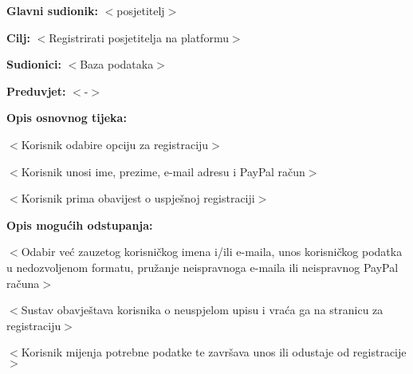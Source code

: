 								\noindent {}
							\begin{packed_item}
			
								\item \textbf{Glavni sudionik: }$<$posjetitelj$>$
								\item  \textbf{Cilj:} $<$Registrirati posjetitelja na platformu$>$
								\item  \textbf{Sudionici:} $<$Baza podataka$>$
								\item  \textbf{Preduvjet:} $<$-$>$
								\item  \textbf{Opis osnovnog tijeka:}
								
								\item[] \begin{packed_enum}
			
									\item $<$Korisnik odabire opciju za registraciju$>$
									\item $<$Korisnik unosi ime, prezime, e-mail adresu i PayPal račun$>$
									\item $<$Korisnik prima obavijest o uspješnoj registraciji$>$
								\end{packed_enum}
								
								\item  \textbf{Opis mogućih odstupanja:}
								
								\item[] \begin{packed_item}
			
									\item[2.a] $<$Odabir već zauzetog korisničkog imena i/ili e-maila, unos korisničkog 
									podatka u nedozvoljenom formatu, pružanje neispravnoga e-maila ili neispravnog PayPal računa$>$
									\item[] \begin{packed_enum}
										
										\item $<$Sustav obavještava korisnika o neuspjelom upisu i 
										vraća ga na stranicu za registraciju$>$
										\item $<$Korisnik mijenja potrebne podatke te završava unos ili
										odustaje od registracije$>$
										
									\end{packed_enum}
									
								\end{packed_item}
							\end{packed_item}
						
